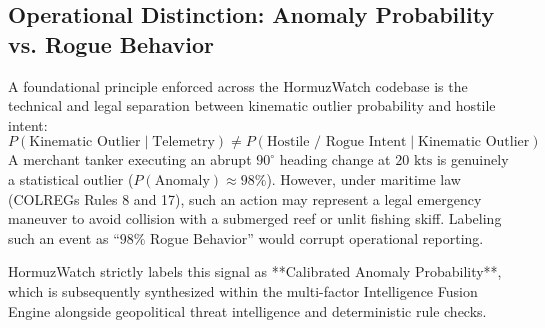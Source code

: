 \subsection{Operational Distinction: Anomaly Probability vs. Rogue Behavior}
A foundational principle enforced across the HormuzWatch codebase is the technical and legal separation between kinematic outlier probability and hostile intent:
\begin{equation}
P(\text{Kinematic Outlier} \mid \text{Telemetry}) \neq P(\text{Hostile / Rogue Intent} \mid \text{Kinematic Outlier})
\end{equation}
A merchant tanker executing an abrupt $90^\circ$ heading change at $20\text{ kts}$ is genuinely a statistical outlier ($P(\text{Anomaly}) \approx 98\%$). However, under maritime law (COLREGs Rules 8 and 17), such an action may represent a legal emergency maneuver to avoid collision with a submerged reef or unlit fishing skiff. Labeling such an event as ``$98\%$ Rogue Behavior'' would corrupt operational reporting.

HormuzWatch strictly labels this signal as **Calibrated Anomaly Probability**, which is subsequently synthesized within the multi-factor Intelligence Fusion Engine alongside geopolitical threat intelligence and deterministic rule checks.
